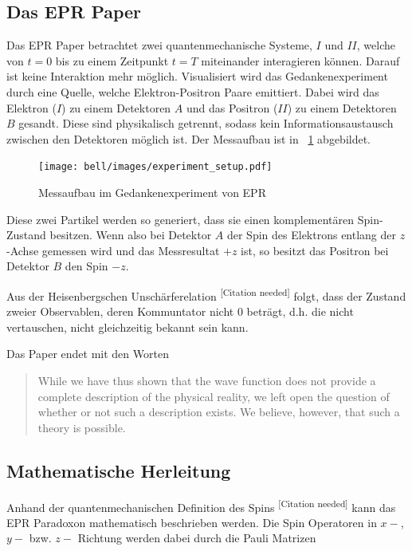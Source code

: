 \begin{refsection}
\subsection{Das EPR Paper}
Das EPR Paper betrachtet zwei quantenmechanische Systeme, $I$ und $II$,
welche von $t=0$ bis zu einem Zeitpunkt $t=T$ miteinander 
interagieren k\"onnen. Darauf ist keine Interaktion mehr m\"oglich.
Visualisiert wird das Gedankenexperiment durch eine Quelle, welche
Elektron-Positron Paare emittiert. 
Dabei wird das Elektron ($I$) zu einem Detektoren $A$ und das 
Positron ($II$) zu einem Detektoren $B$ gesandt.
Diese sind physikalisch getrennt, sodass kein Informationsaustausch
zwischen den Detektoren m\"oglich ist.
Der Messaufbau ist in \figurename~\ref{fig:bell:EPR_Messaufbau} abgebildet.

\begin{figure}
    \centering
    \texttt{[image: bell/images/experiment\_setup.pdf]}
    \caption{Messaufbau im Gedankenexperiment von EPR}
    \label{fig:bell:EPR_Messaufbau}
\end{figure}

Diese zwei Partikel werden so generiert, dass sie einen komplement\"aren
Spin-Zustand besitzen. 
Wenn also bei Detektor $A$ der Spin des Elektrons entlang der $z$-Achse
gemessen wird und das Messresultat $+z$ ist, so besitzt das Positron bei
Detektor $B$ den Spin $-z$.

Aus der Heisenbergschen Unsch\"arferelation
\textsuperscript{[Citation needed]}
folgt, dass der Zustand zweier Observablen, deren Kommuntator
nicht $0$ betr\"agt, d.h. die nicht vertauschen, nicht gleichzeitig
bekannt sein kann.

Das Paper endet mit den Worten
\begin{quote}
    While we have thus shown that the wave function does not provide
    a complete description of the physical reality, we left open the
    question of whether or not such a description exists.
    We believe, however, that such a theory is possible.
\end{quote}

\subsection{Mathematische Herleitung}
Anhand der quantenmechanischen Definition des Spins
\textsuperscript{[Citation needed]}
kann das EPR Paradoxon mathematisch beschrieben werden.
Die Spin Operatoren in $x-$, $y-$ bzw. $z-$ Richtung werden dabei durch
die Pauli Matrizen 


\end{refsection}
